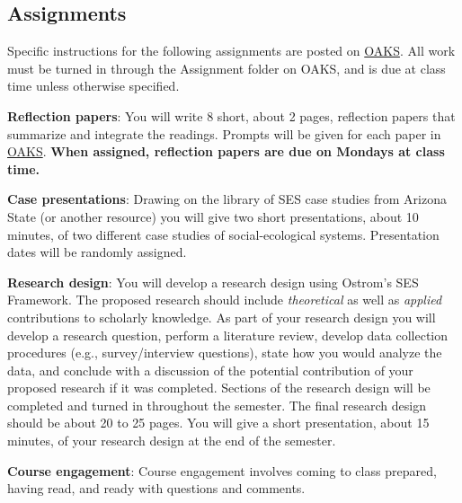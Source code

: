 \hypertarget{assignments}{%
\subsection{Assignments}\label{assignments}}

Specific instructions for the following assignments are posted on
\href{https://lms.cofc.edu/d2l/home}{OAKS}. All work must be turned in
through the Assignment folder on OAKS, and is due at class time unless
otherwise specified.

\vspace{0.10in}

\noindent \textbf{Reflection papers}: You will write 8 short, about 2
pages, reflection papers that summarize and integrate the readings.
Prompts will be given for each paper in
\href{https://lms.cofc.edu}{OAKS}. \textbf{When assigned, reflection
papers are due on Mondays at class time.}

\vspace{0.10in}

\noindent \textbf{Case presentations}: Drawing on the library of SES
case studies from Arizona State (or another resource) you will give two
short presentations, about 10 minutes, of two different case studies of
social-ecological systems. Presentation dates will be randomly assigned.

\vspace{0.10in}

\noindent \textbf{Research design}: You will develop a research design
using Ostrom's SES Framework. The proposed research should include
\emph{theoretical} as well as \emph{applied} contributions to scholarly
knowledge. As part of your research design you will develop a research
question, perform a literature review, develop data collection
procedures (e.g., survey/interview questions), state how you would
analyze the data, and conclude with a discussion of the potential
contribution of your proposed research if it was completed. Sections of
the research design will be completed and turned in throughout the
semester. The final research design should be about 20 to 25 pages. You
will give a short presentation, about 15 minutes, of your research
design at the end of the semester.

\vspace{0.10in}

\noindent \textbf{Course engagement}: Course engagement involves coming
to class prepared, having read, and ready with questions and comments.

